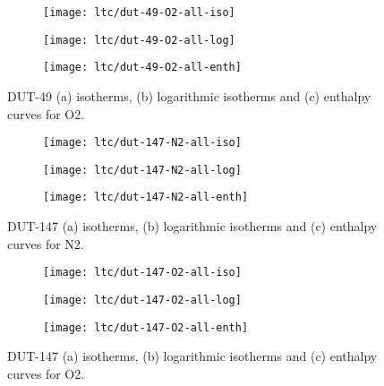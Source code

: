 \begin{figure}[htb]
    \centering
    \begin{subfigure}{0.33\linewidth}
        \texttt{[image: ltc/dut-49-O2-all-iso]}%
        \caption{}
    \end{subfigure}%
    \begin{subfigure}{0.33\linewidth}
        \texttt{[image: ltc/dut-49-O2-all-log]}%
        \caption{}
    \end{subfigure}%
    \begin{subfigure}{0.33\linewidth}
        \texttt{[image: ltc/dut-49-O2-all-enth]}%
        \caption{}
    \end{subfigure}%
    \caption{DUT-49 (a) isotherms, (b) logarithmic isotherms and 
    (c) enthalpy curves for O2.}%
    \label{appx:dut:fig:dut-49-O2-ltc}
\end{figure}

\begin{figure}[htb]
    \centering
    \begin{subfigure}{0.33\linewidth}
        \texttt{[image: ltc/dut-147-N2-all-iso]}%
        \caption{}
    \end{subfigure}%
    \begin{subfigure}{0.33\linewidth}
        \texttt{[image: ltc/dut-147-N2-all-log]}%
        \caption{}
    \end{subfigure}%
    \begin{subfigure}{0.33\linewidth}
        \texttt{[image: ltc/dut-147-N2-all-enth]}%
        \caption{}
    \end{subfigure}%
    \caption{DUT-147 (a) isotherms, (b) logarithmic isotherms and 
    (c) enthalpy curves for N2.}%
    \label{appx:dut:fig:dut-147-N2-ltc}
\end{figure}

\begin{figure}[htb]
    \centering
    \begin{subfigure}{0.33\linewidth}
        \texttt{[image: ltc/dut-147-O2-all-iso]}%
        \caption{}
    \end{subfigure}%
    \begin{subfigure}{0.33\linewidth}
        \texttt{[image: ltc/dut-147-O2-all-log]}%
        \caption{}
    \end{subfigure}%
    \begin{subfigure}{0.33\linewidth}
        \texttt{[image: ltc/dut-147-O2-all-enth]}%
        \caption{}
    \end{subfigure}%
    \caption{DUT-147 (a) isotherms, (b) logarithmic isotherms and 
    (c) enthalpy curves for O2.}%
    \label{appx:dut:fig:dut-147-O2-ltc}
\end{figure}

